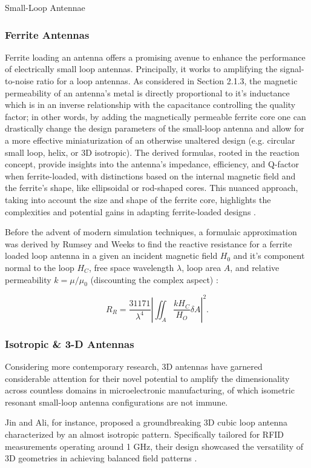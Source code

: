 \documentclass[12pt]{article}
\begin{document}
\begin{section} {Small-Loop Antennae}
\subsubsection{Ferrite Antennas}

Ferrite loading an antenna offers a promising avenue to enhance the performance of electrically small loop antennas. Principally, it works to amplifying the signal-to-noise ratio for a loop antennas. As considered in Section 2.1.3, the magnetic permeability of an antenna's metal is directly proportional to it's inductance which is in an inverse relationship with the capacitance controlling the quality factor; in other words, by adding the magnetically permeable ferrite core one can drastically change the design parameters of the small-loop antenna and allow for a more effective miniaturization of an otherwise unaltered design (e.g. circular small loop, helix, or 3D isotropic). The derived formulas, rooted in the reaction concept, provide insights into the antenna's impedance, efficiency, and Q-factor when ferrite-loaded, with distinctions based on the internal magnetic field and the ferrite's shape, like ellipsoidal or rod-shaped cores. This nuanced approach, taking into account the size and shape of the ferrite core, highlights the complexities and potential gains in adapting ferrite-loaded designs \cite{rumsey_electrically_1956}.

Before the advent of modern simulation techniques, a formulaic approximation was derived by Rumsey and Weeks to find the reactive resistance for a ferrite loaded loop antenna in a given an incident magnetic field  $H_0$ and it's component normal to the loop $H_C$, free space wavelength $\lambda$, loop area $A$, and relative permeability $k = \mu / \mu_0 $ (discounting the complex aspect) \cite{rumsey_electrically_1956}:

\[
R_R = \frac{31171}{\lambda^{4}} \left| \iint_{A} \frac{k H_C}{H_O} \delta A \right|^{2} .
\] 

\subsubsection{Isotropic \& 3-D Antennas}

Considering more contemporary research, 3D antennas have garnered considerable attention for their novel potential to amplify the dimensionality across countless domains in microelectronic manufacturing, of which isometric resonant small-loop antenna configurations are not immune.

Jin and Ali, for instance, proposed a groundbreaking 3D cubic loop antenna characterized by an almost isotropic pattern. Specifically tailored for RFID measurements operating around 1 GHz, their design showcased the versatility of 3D geometries in achieving balanced field patterns \cite{jin_novel_2014}.


\end{section}
\end{document}
